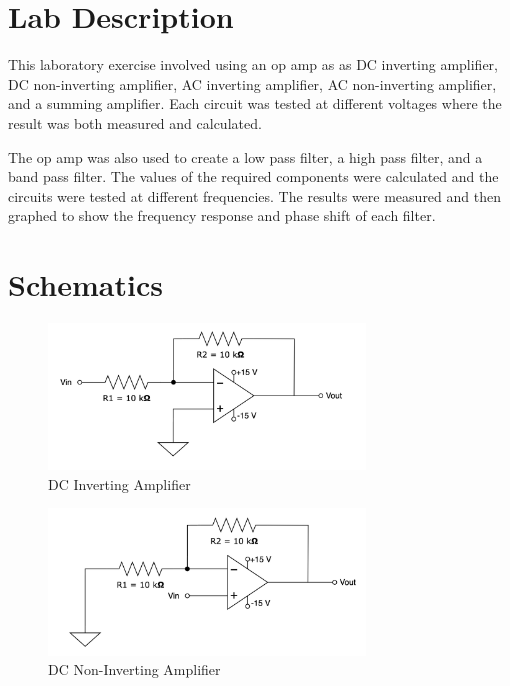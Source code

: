 \documentclass[CMPE]{KGCOEReport}
\begin{document}
\maketitle

\section*{Lab Description}

This laboratory exercise involved using an op amp as as DC inverting amplifier, DC non-inverting amplifier, AC inverting amplifier, AC non-inverting amplifier, and a summing amplifier. Each circuit was tested at different voltages where the result was both measured and calculated.

The op amp was also used to create a low pass filter, a high pass filter, and a band pass filter. The values of the required components were calculated and the circuits were tested at different frequencies. The results were measured and then graphed to show the frequency response and phase shift of each filter.

\section*{Schematics}

\begin{figure}[H]
    \centering
    \includegraphics[width=0.75\textwidth]{1.png}
    \caption{DC Inverting Amplifier}
    \label{fig:part1}
\end{figure}

\begin{figure}[H]
    \centering
    \includegraphics[width=0.75\textwidth]{2.png}
    \caption{DC Non-Inverting Amplifier}
    \label{fig:part2}
\end{figure}
\end{document}
